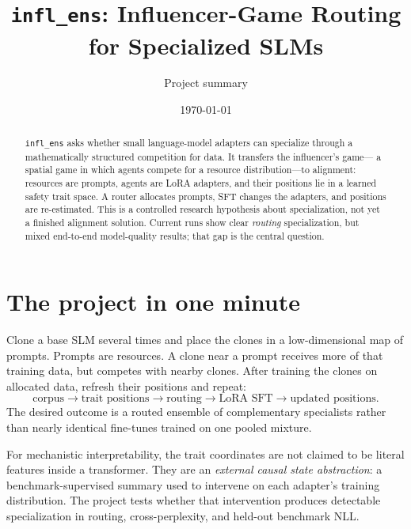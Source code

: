 \documentclass[11pt]{article}
\title{\texttt{infl\_ens}: Influencer-Game Routing for Specialized SLMs}
\author{Project summary}
\date{\today}
\begin{document}
\maketitle
\begin{abstract}
\texttt{infl\_ens} asks whether small language-model adapters can specialize through
a mathematically structured competition for data. It transfers the influencer's game---
a spatial game in which agents compete for a resource distribution---to alignment:
resources are prompts, agents are LoRA adapters, and their positions lie in a learned
safety trait space. A router allocates prompts, SFT changes the adapters, and positions
are re-estimated. This is a controlled research hypothesis about specialization, not yet
a finished alignment solution. Current runs show clear \emph{routing} specialization,
but mixed end-to-end model-quality results; that gap is the central question.
\end{abstract}

\section{The project in one minute}
Clone a base SLM several times and place the clones in a low-dimensional map of prompts.
Prompts are resources. A clone near a prompt receives more of that training data, but
competes with nearby clones. After training the clones on allocated data, refresh their
positions and repeat:
\[
\text{corpus}\rightarrow\text{trait positions}\rightarrow\text{routing}\rightarrow
\text{LoRA SFT}\rightarrow\text{updated positions}.
\]
The desired outcome is a routed ensemble of complementary specialists rather than
nearly identical fine-tunes trained on one pooled mixture.

For mechanistic interpretability, the trait coordinates are not claimed to be literal
features inside a transformer. They are an \emph{external causal state abstraction}:
a benchmark-supervised summary used to intervene on each adapter's training
distribution. The project tests whether that intervention produces detectable
specialization in routing, cross-perplexity, and held-out benchmark NLL.
\end{document}

